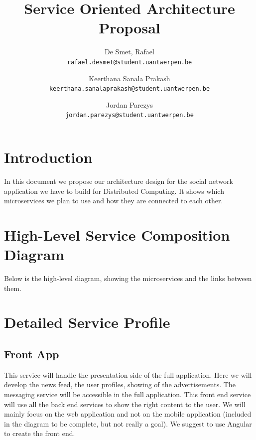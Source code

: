 \documentclass[a4paper,12pt]{article}
\begin{document}
\title{Service Oriented Architecture Proposal}
\author{
  De Smet, Rafael \\
  \texttt{rafael.desmet@student.uantwerpen.be}
  \and
  Keerthana Sanala Prakash \\
  \texttt{keerthana.sanalaprakash@student.uantwerpen.be}
  \and
  Jordan Parezys \\
  \texttt{jordan.parezys@student.uantwerpen.be}
}
\date{}
\maketitle

\section{Introduction}

In this document we propose our architecture design for the social network application we have to build for Distributed Computing. It shows which microservices we plan to use and how they are connected to each other.

\section{High-Level Service Composition Diagram}

Below is the high-level diagram, showing the microservices and the links between them.

\section{Detailed Service Profile}

\subsection{Front App}

This service will handle the presentation side of the full application. Here we will develop the news feed, the user profiles, showing of the advertisements. The messaging service will be accessible in the full application. This front end service will use all the back end services to show the right content to the user. We will mainly focus on the web application and not on the mobile application (included in the diagram to be complete, but not really a goal).
\newline
\newline
We suggest to use Angular to create the front end.
\end{document}
